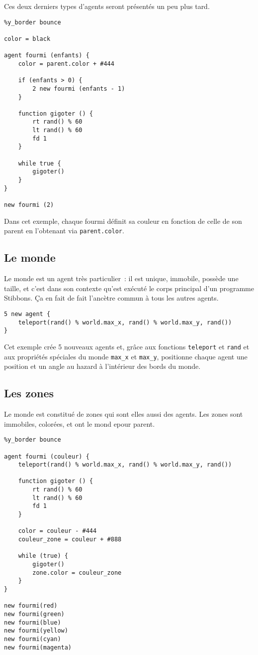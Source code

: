 Ces deux derniers types d'agents seront présentés un peu plus tard.

\begin{lstlisting}[language=Stibbons]
%x_border bounce
%y_border bounce

color = black

agent fourmi (enfants) {
    color = parent.color + #444

    if (enfants > 0) {
        2 new fourmi (enfants - 1)
    }

    function gigoter () {
        rt rand() % 60
        lt rand() % 60
        fd 1
    }

    while true {
        gigoter()
    }
}

new fourmi (2)
\end{lstlisting}

Dans cet exemple, chaque fourmi définit sa couleur en fonction de celle de son parent en l'obtenant via \verb|parent.color|.

\subsection{Le monde}

Le monde est un agent très particulier~: il est unique, immobile, possède une taille, et c'est dans son contexte qu'est exécuté le corps principal d'un programme Stibbons. Ça en fait de fait l'ancètre commun à tous les autres agents.

\begin{lstlisting}[language=Stibbons]
5 new agent {
    teleport(rand() % world.max_x, rand() % world.max_y, rand())
}
\end{lstlisting}

Cet exemple crée 5 nouveaux agents et, grâce aux fonctions \verb|teleport| et \verb|rand| et aux propriétés spéciales du monde \verb|max_x| et \verb|max_y|, positionne chaque agent une position et un angle au hazard à l'intérieur des bords du monde.

\subsection{Les zones}

Le monde est constitué de zones qui sont elles aussi des agents. Les zones sont immobiles, colorées, et ont le mond epour parent.

\begin{lstlisting}[language=Stibbons]
%x_border bounce
%y_border bounce

agent fourmi (couleur) {
    teleport(rand() % world.max_x, rand() % world.max_y, rand())

    function gigoter () {
        rt rand() % 60
        lt rand() % 60
        fd 1
    }

    color = couleur - #444
    couleur_zone = couleur + #888

    while (true) {
        gigoter()
        zone.color = couleur_zone
    }
}

new fourmi(red)
new fourmi(green)
new fourmi(blue)
new fourmi(yellow)
new fourmi(cyan)
new fourmi(magenta)
\end{lstlisting}

